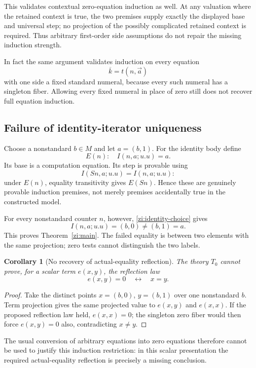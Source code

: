 \documentclass[11pt]{article}
\newtheorem{corollary}[theorem]{Corollary}
\theoremstyle{definition}
\begin{document}
This validates contextual zero-equation induction as well. At any valuation where the retained context is true, the two premises supply exactly the displayed base and universal step; no projection of the possibly complicated retained context is required. Thus arbitrary first-order side assumptions do not repair the missing induction strength.

In fact the same argument validates induction on every equation
\[
\overline{k}=t(n,\vec a)
\]
with one side a fixed standard numeral, because every such numeral has a singleton fiber. Allowing every fixed numeral in place of zero still does not recover full equation induction.

\subsection{Failure of identity-iterator uniqueness}

Choose a nonstandard \(b\in M\) and let \(a=(b,1)\). For the identity body define
\[
E(n):\quad I(n,a;u.u)=a.
\]
Its base is a computation equation. Its step is provable using
\[
I(Sn,a;u.u)=I(n,a;u.u):
\]
under \(E(n)\), equality transitivity gives \(E(Sn)\). Hence these are genuinely provable induction premises, not merely premises accidentally true in the constructed model.

For every nonstandard counter \(n\), however, \eqref{zi:identity-choice} gives
\[
I(n,a;u.u)=(b,0)\ne(b,1)=a.
\]
This proves Theorem~\ref{zi:main}. The failed equality is between two elements with the same projection; zero tests cannot distinguish the two labels.

\begin{corollary}[No recovery of actual-equality reflection]
\label{zi:no-reflection}
The theory \(T_0\) cannot prove, for a scalar term \(e(x,y)\), the reflection law
\[
e(x,y)=0\quad\longleftrightarrow\quad x=y.
\]
\end{corollary}
\begin{proof}
Take the distinct points \(x=(b,0)\), \(y=(b,1)\) over one nonstandard \(b\). Term projection gives the same projected value to \(e(x,y)\) and \(e(x,x)\). If the proposed reflection law held, \(e(x,x)=0\); the singleton zero fiber would then force \(e(x,y)=0\) also, contradicting \(x\ne y\).
\end{proof}

The usual conversion of arbitrary equations into zero equations therefore cannot be used to justify this induction restriction: in this scalar presentation the required actual-equality reflection is precisely a missing conclusion.
\end{document}
